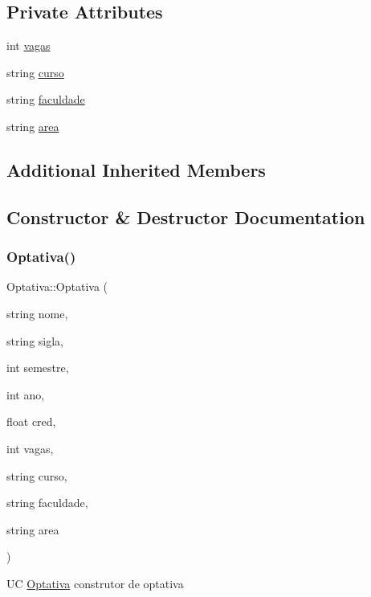 \subsection*{Private Attributes}
\begin{DoxyCompactItemize}
\item 
int \hyperlink{class_optativa_a7502cd3259bb95dd8ceb3af9a8eb326a}{vagas}
\item 
string \hyperlink{class_optativa_a16a774ceaeb9ff2e4755540e01ee7a03}{curso}
\item 
string \hyperlink{class_optativa_aba2a76842ec9cf99d8ee4f6b5ad37019}{faculdade}
\item 
string \hyperlink{class_optativa_ac4fb0a80ff662efca795bf932bea9a77}{area}
\end{DoxyCompactItemize}
\subsection*{Additional Inherited Members}


\subsection{Constructor \& Destructor Documentation}
\hypertarget{class_optativa_a276b885ae681b87285f428c9b819b486}{}\label{class_optativa_a276b885ae681b87285f428c9b819b486} 
\subsubsection{\texorpdfstring{Optativa()}{Optativa()}}
{\footnotesize\ttfamily Optativa\+::\+Optativa (\begin{DoxyParamCaption}\item[{string}]{nome,  }\item[{string}]{sigla,  }\item[{int}]{semestre,  }\item[{int}]{ano,  }\item[{float}]{cred,  }\item[{int}]{vagas,  }\item[{string}]{curso,  }\item[{string}]{faculdade,  }\item[{string}]{area }\end{DoxyParamCaption})}

UC \hyperlink{class_optativa}{Optativa} construtor de optativa \hypertarget{class_optativa_a9a32ddeaa6e1bddcf55fa5805e2c06ec}{}\label{class_optativa_a9a32ddeaa6e1bddcf55fa5805e2c06ec} 
